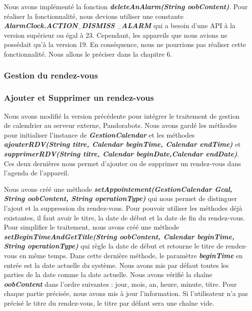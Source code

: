 \indent Nous avons implémenté la fonction \textbf{\emph{deleteAnAlarm(String oobContent)}}. Pour réaliser la fonctionnalité, nous devions utiliser une constante \textbf{\emph{AlarmClock.ACTION$_-$DISMISS $_-$ALARM}} qui a besoin d'une API à la version supérieur ou égal à 23. Cependant, les appareils que nous avions ne possédait qu'à la version 19. En conséquence, nous ne pourrions pas réaliser cette fonctionnalité. Nous allons le préciser dans la chapitre 6.

\subsubsection{Gestion du rendez-vous}

\subsubsection*{Ajouter et Supprimer un rendez-vous}

\indent Nous avons modifié la version précédente pour intégrer le traitement de gestion de calendrier au serveur externe, Pandorabots. Nous avons gardé les méthodes pour initialiser l'instance de \textbf{\emph{GestionCalendar}} et les méthodes \textbf{\emph{ajouterRDV(String titre, Calendar beginTime, Calendar endTime)}} et \textbf{\emph{supprimerRDV(String titre, Calendar beginDate,Calendar endDate)}}. Ces deux dernières nous permet d'ajouter ou de supprimer un rendez-vous dans l'agenda de l'appareil.

\indent Nous avons créé une méthode \textbf{\emph{setAppointement(GestionCalendar Gcal, String oobContent, String operationType)}} qui nous permet de distinguer l'ajout et la suppression du rendez-vous. Pour pouvoir utiliser les méthodes déjà existantes, il faut avoir le titre, la date de début et la date de fin du rendez-vous. Pour simplifier le traitement, nous avons créé une méthode \textbf{\emph{setBeginTimeAndGetTitle(String oobContent, Calendar beginTime, String operationType)}} qui règle la date de début et retourne le titre de rendez-vous en même temps. Dans cette dernière méthode, le paramètre \textbf{\emph{beginTime}} en entrée est la date actuelle du système. Nous avons mis par défaut toutes les parties de la date comme la date actuelle. Nous avons vérifié la chaîne \textbf{\emph{oobContent}} dans l'ordre suivantes : jour, mois, an, heure, minute, titre. Pour chaque partie précisée, nous avons mis à jour l'information. Si l'utilisateur n'a pas précisé le titre du rendez-vous, le titre par défaut sera une chaîne vide.

